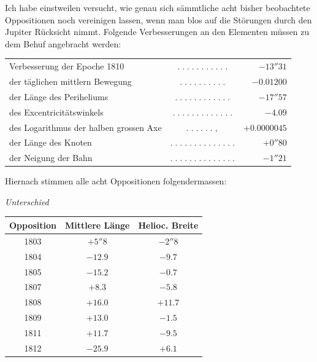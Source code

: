 \par\indent Ich habe einstweilen versucht, wie genau sich sämmtliche acht bisher beobachtete Oppositionen
noch vereinigen lassen, wenn man blos auf die Störungen durch den Jupiter Rücksicht nimmt. Folgende
Verbesserungen an den Elementen müssen zu dem Behuf angebracht werden:

\begin{center}\fontsize{9}{11}\selectfont\setlength{\tabcolsep}{2pt}\renewcommand{\arraystretch}{1.15}\begin{tabular}{lcr}
Verbesserung der Epoche 1810 & $.\;.\;.\;.\;.\;.\;.\;.\;.\;.\;.$ & $-13''31$\\
der täglichen mittlern Bewegung & $.\;.\;.\;.\;.\;.\;.\;.\;.\;.$ & $-0.01200$\\
der Länge des Periheliums & $.\;.\;.\;.\;.\;.\;.\;.\;.\;.\;.\;.$ & $-17''57$\\
des Excentricitätswinkels & $.\;.\;.\;.\;.\;.\;.\;.\;.\;.\;.\;.\;.$ & $-4.09$\\
des Logarithmus der halben grossen Axe & $.\;.\;.\;.\;.\;.\;,$ & $+0.0000045$\\
der Länge des Knoten & $.\;.\;.\;.\;.\;.\;.\;.\;.\;.\;.\;.\;.\;.$ & $+0''80$\\
der Neigung der Bahn & $.\;.\;.\;.\;.\;.\;.\;.\;.\;.\;.\;.\;.\;.$ & $-1''21$\\
\end{tabular}\end{center}

\noindent Hiernach stimmen alle acht Oppositionen folgendermassen:

\begin{center}
\emph{Unterschied}
\end{center}

\begin{center}
\fontsize{10}{12}\selectfont\setlength{\tabcolsep}{6pt}\renewcommand{\arraystretch}{1.15}\begin{tabular}{c|c|c}
Opposition & Mittlere Länge & Helioc. Breite \\
\hline
1803 & $+5''8$ & $-2''8$ \\
1804 & $-12.9$ & $-9.7$ \\
1805 & $-15.2$ & $-0.7$ \\
1807 & $+8.3$ & $-5.8$ \\
1808 & $+16.0$ & $+11.7$ \\
1809 & $+13.0$ & $-1.5$ \\
1811 & $+11.7$ & $-9.5$ \\
1812 & $-25.9$ & $+6.1$ \\
\end{tabular}
\end{center}

